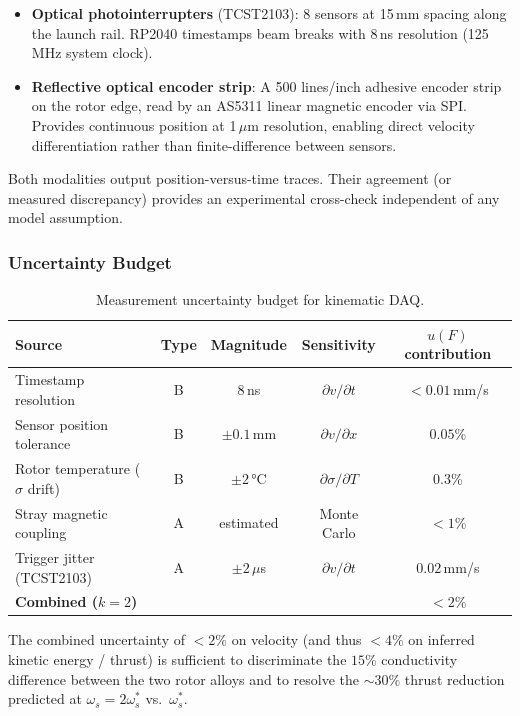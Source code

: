 \documentclass[12pt,letterpaper]{article}
\begin{document}
\begin{itemize}[noitemsep]
  \item \textbf{Optical photointerrupters} (TCST2103): 8 sensors at 15\,mm spacing
    along the launch rail. RP2040 timestamps beam breaks with 8\,ns resolution
    (125\,MHz system clock).
  \item \textbf{Reflective optical encoder strip}: A 500 lines/inch adhesive encoder
    strip on the rotor edge, read by an AS5311 linear magnetic encoder via SPI.
    Provides continuous position at 1\,$\mu$m resolution, enabling direct velocity
    differentiation rather than finite-difference between sensors.
\end{itemize}

Both modalities output position-versus-time traces. Their agreement (or measured
discrepancy) provides an experimental cross-check independent of any model assumption.

\subsubsection{Uncertainty Budget}

\begin{table}[H]
\centering
\caption{Measurement uncertainty budget for kinematic DAQ.}
\label{tab:uncertainty}
\begin{tabularx}{\textwidth}{Xcccc}
\toprule
\textbf{Source} & \textbf{Type} & \textbf{Magnitude} & \textbf{Sensitivity} & \textbf{$u(F)$ contribution} \\
\midrule
Timestamp resolution & B & 8\,ns & $\partial v/\partial t$ & $<0.01$\,mm/s \\
Sensor position tolerance & B & $\pm 0.1$\,mm & $\partial v/\partial x$ & $0.05$\% \\
Rotor temperature ($\sigma$ drift) & B & $\pm 2$\,°C & $\partial\sigma/\partial T$ & $0.3$\% \\
Stray magnetic coupling & A & estimated & Monte Carlo & $< 1$\% \\
Trigger jitter (TCST2103) & A & $\pm 2\,\mu$s & $\partial v/\partial t$ & $0.02$\,mm/s \\
\midrule
\textbf{Combined ($k=2$)} & & & & $< 2$\% \\
\bottomrule
\end{tabularx}
\end{table}

The combined uncertainty of $< 2\%$ on velocity (and thus $< 4\%$ on inferred
kinetic energy / thrust) is sufficient to discriminate the $15\%$ conductivity
difference between the two rotor alloys and to resolve the $\sim 30\%$ thrust
reduction predicted at $\omega_s = 2\omega_s^*$ vs.\ $\omega_s^*$.
\end{document}
